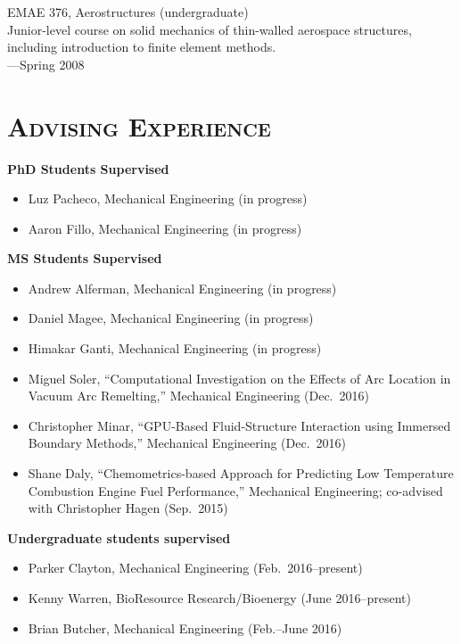 \documentclass[margin,line,11pt]{res}
\begin{document}
\begin{resume}
EMAE 376, Aerostructures (undergraduate) \\
Junior-level course on solid mechanics of thin-walled aerospace structures, including introduction to finite element methods. \\
---Spring 2008

\section{\textsc{Advising Experience}}

\textbf{PhD Students Supervised}
\begin{itemize}[leftmargin=*]
\item Luz Pacheco, Mechanical Engineering (in progress)
\item Aaron Fillo, Mechanical Engineering (in progress)
\end{itemize}

\textbf{MS Students Supervised}
\begin{itemize}[leftmargin=*]
\item Andrew Alferman, Mechanical Engineering (in progress)
\item Daniel Magee, Mechanical Engineering (in progress)
\item Himakar Ganti, Mechanical Engineering (in progress)
\item Miguel Soler, ``Computational Investigation on the Effects of Arc Location in Vacuum Arc Remelting,'' Mechanical Engineering (Dec.\ 2016)
\item Christopher Minar, ``GPU-Based Fluid-Structure Interaction using Immersed Boundary Methods,'' Mechanical Engineering (Dec.\ 2016)
\item Shane Daly, ``Chemometrics-based Approach for Predicting Low Temperature Combustion Engine Fuel Performance,'' Mechanical Engineering; co-advised with Christopher Hagen (Sep.\ 2015)
\end{itemize}

\textbf{Undergraduate students supervised}
\begin{itemize}[leftmargin=*]
    \item Parker Clayton, Mechanical Engineering (Feb.\ 2016--present)
    \item Kenny Warren, BioResource Research\slash Bioenergy (June 2016--present)
    \item Brian Butcher, Mechanical Engineering (Feb.--June 2016)
\end{itemize}


\end{resume}
\end{document}
